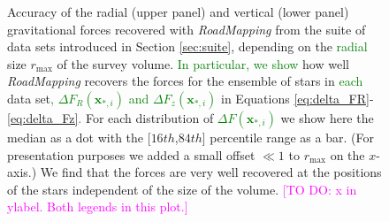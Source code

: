 \documentclass[iop,revtex4,numberedappendix,appendixfloats]{emulateapj}
\newcommand{\vect}[1]{\boldsymbol{#1}}
\newcommand{\RM}{{\sl RoadMapping}}
\newcommand{\Wilma}[1]{\textcolor{Magenta}{#1}}
\newcommand{\NEW}[1]{\textcolor{Green}{#1}}
\newcommand{\OLD}[1]{}
\begin{document}
\begin{figure}[!htbp]
  \caption{Accuracy of the radial (upper panel\OLD{s}) and vertical (lower panel\OLD{s}) gravitational forces recovered with \RM{} from the suite of data sets introduced in Section \ref{sec:suite}, depending on the \NEW{radial} size $r_\text{max}$ of the survey volume. \NEW{In particular, we show}\OLD{The left panels show} how well \RM{} recovers the forces for the ensemble of stars in \OLD{the}\NEW{each} data set\NEW{,} \OLD{(}\OLD{$\Delta F_{R}(*_i)$ and $\Delta F_{z}(*_i)$}\NEW{$\Delta F_{R}(\vect{x}_{*,i})$ and $\Delta F_{z}(\vect{x}_{*,i})$} in Equations \eqref{eq:delta_FR}-\eqref{eq:delta_Fz}\OLD{)}\NEW{.}\OLD{and the right panels test the predictive power of each of the data sets' best-fit potential by showing how well the forces are recovered at regular grid points in a large cylinder of $r_\text{max}=5~\text{kpc}$ and height $|z|=1.5~\text{kpc}$ around the survey volumes' center (\OLD{$\Delta F_{R}(g_j)$ and $\Delta F_{z}(g_j)$}\NEW{$\Delta F_{R}(\vect{x}_{g,j})$ and $\Delta F_{z}(\vect{x}_{g,j})$} in Equations \eqref{eq:delta_FR_grid}-\eqref{eq:delta_Fz_grid}).} For each distribution of \OLD{$\Delta F(*_i)$}\NEW{$\Delta F(\vect{x}_{*,i})$} \OLD{and $\Delta F(g_j)$} we show here the median as a dot with the  [$16th$,$84th$] percentile range as a bar. (For presentation purposes we added a small offset $\ll 1$ to $r_\text{max}$ on the $x$-axis.) We find that the forces are very well recovered at the positions of the stars independent of the size of the volume. \OLD{The spiral arms introduce some biases in the overall recovered potential and we need at least a survey volume of $r_\text{max}=3~\text{kpc}$ to get a potential with a reasonable predictive power.} \Wilma{[TO DO: x in ylabel. Both legends in this plot.]}}
\label{fig:forces_bias_a}
\end{figure}
\end{document}
